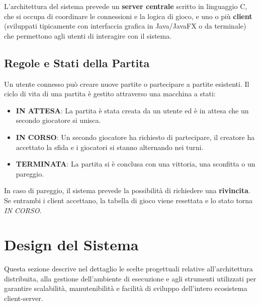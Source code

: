 \documentclass[11pt, a4paper]{article}
\begin{document}
L'architettura del sistema prevede un \textbf{server centrale} scritto in linguaggio C, che si occupa di coordinare le connessioni e la logica di gioco, e uno o più \textbf{client} (sviluppati tipicamente con interfaccia grafica in Java/JavaFX o da terminale) che permettono agli utenti di interagire con il sistema.

\subsection{Regole e Stati della Partita}
Un utente connesso può creare nuove partite o partecipare a partite esistenti. Il ciclo di vita di una partita è gestito attraverso una macchina a stati:
\begin{itemize}
    \item \textbf{IN ATTESA}: La partita è stata creata da un utente ed è in attesa che un secondo giocatore si unisca.
    \item \textbf{IN CORSO}: Un secondo giocatore ha richiesto di partecipare, il creatore ha accettato la sfida e i giocatori si stanno alternando nei turni.
    \item \textbf{TERMINATA}: La partita si è conclusa con una vittoria, una sconfitta o un pareggio.
\end{itemize}

In caso di pareggio, il sistema prevede la possibilità di richiedere una \textbf{rivincita}. Se entrambi i client accettano, la tabella di gioco viene resettata e lo stato torna \textit{IN CORSO}.

\newpage
\section{Design del Sistema}

Questa sezione descrive nel dettaglio le scelte progettuali relative all'architettura distribuita, alla gestione dell'ambiente di esecuzione e agli strumenti utilizzati per garantire scalabilità, manutenibilità e facilità di sviluppo dell'intero ecosistema client-server.
\end{document}
